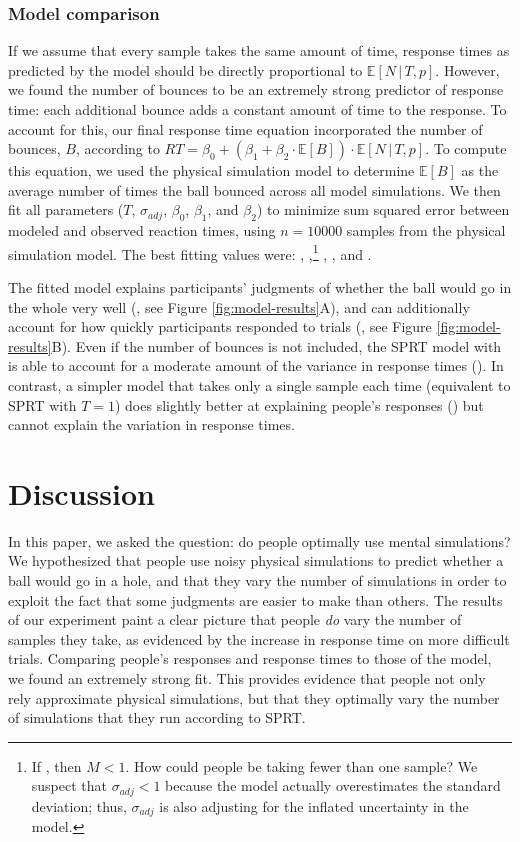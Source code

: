 \documentclass[10pt,letterpaper]{article}
\begin{document}
\subsubsection{Model comparison}

If we assume that every sample takes the same amount of time, response times as predicted by the model should be directly proportional to $\mathbb{E}[N\,|\,T,p]$.
However, we found the number of bounces to be an extremely strong predictor of response time: each additional bounce adds a constant amount of time to the response.
To account for this, our final response time equation incorporated the number of bounces, $B$, according to $RT = \beta_0 + (\beta_1 + \beta_2\cdot{}\mathbb{E}[B]) \cdot{}\mathbb{E}[N\,|\,T,p]$.
To compute this equation, we used the physical simulation model to determine $\mathbb{E}[B]$ as the average number of times the ball bounced across all model simulations.
We then fit all parameters ($T$, $\sigma_{adj}$, $\beta_0$, $\beta_1$, and $\beta_2$) to minimize sum squared error between modeled and observed reaction times, using $n=10000$ samples from the physical simulation model.
The best fitting values were: \threshold{}, \sdadj{},\footnote{If \sdadj{}, then $M<1$. How could people be taking fewer than one sample?
We suspect that $\sigma_{adj}<1$ because the model actually overestimates the standard deviation; thus, $\sigma_{adj}$ is also adjusting for the inflated uncertainty in the model.} \betazero{}, \betaone{}, and \betatwo{}.

The fitted model explains participants' judgments of whether the ball would go in the whole very well (\HoleResponseCorr{}, see Figure \ref{fig:model-results}A), and can additionally account for how quickly participants responded to trials (\HoleRTCorr{}, see Figure \ref{fig:model-results}B).
Even if the number of bounces is not included, the SPRT model with \threshold{} is able to account for a moderate amount of the variance in response times (\NoBouncesHoleRTCorr{}).
In contrast, a simpler model that takes only a single sample each time (equivalent to SPRT with $T=1$) does slightly better at explaining people's responses (\RawHoleResponseCorr{}) but cannot explain the variation in response times.

\section{Discussion}

In this paper, we asked the question: do people optimally use mental simulations?
We hypothesized that people use noisy physical simulations to predict whether a ball would go in a hole, and that they vary the number of simulations in order to exploit the fact that some judgments are easier to make than others.
The results of our experiment paint a clear picture that people \emph{do} vary the number of samples they take, as evidenced by the increase in response time on more difficult trials.
Comparing people's responses and response times to those of the model, we found an extremely strong fit.
This provides evidence that people not only rely approximate physical simulations, but that they optimally vary the number of simulations that they run according to SPRT.
\end{document}
